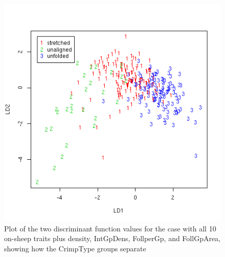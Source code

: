 %

\begin{figure}[!h]
  \centering
  \includegraphics[width=1.1\textwidth]{figplotlda14.png}
  \caption{Plot of the two discriminant function values for the case with all 10  on-sheep traits plus density, IntGpDens, FollperGp, and FollGpArea, showing how the CrimpType groups separate}
  \label{fig:plotlda14}
\end{figure}

%

